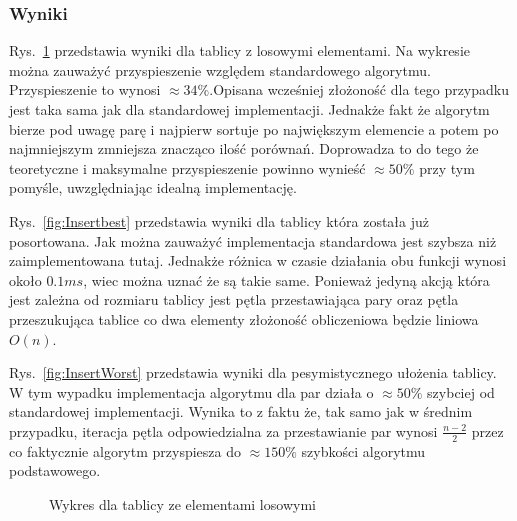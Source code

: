 \subsubsection*{Wyniki}
\par Rys.~\ref{fig:insertRand} przedstawia wyniki dla tablicy z losowymi elementami. Na wykresie można zauważyć przyspieszenie względem standardowego algorytmu. Przyspieszenie to wynosi $ \approx 34 \% $.Opisana wcześniej złożoność dla tego przypadku jest taka sama jak dla standardowej implementacji. Jednakże fakt że algorytm bierze pod uwagę parę i najpierw sortuje po największym elemencie a potem po najmniejszym zmniejsza znacząco ilość porównań. Doprowadza to do tego że teoretyczne i maksymalne przyspieszenie powinno wynieść $ \approx 50\% $ przy tym pomyśle, uwzględniając idealną implementację.
\par Rys.~\ref{fig:Insertbest} przedstawia wyniki dla tablicy która została już posortowana. Jak można zauważyć implementacja standardowa jest szybsza niż zaimplementowana tutaj. Jednakże różnica w czasie działania obu funkcji wynosi około $0.1ms$, wiec można uznać że są takie same. Ponieważ jedyną akcją która jest zależna od rozmiaru tablicy jest pętla przestawiająca pary oraz pętla przeszukująca tablice co dwa elementy złożoność obliczeniowa będzie liniowa $O(n)$.
\par Rys.~\ref{fig:InsertWorst} przedstawia wyniki dla pesymistycznego ułożenia tablicy. W tym wypadku implementacja algorytmu dla par działa o $\approx 50 \% $ szybciej od standardowej implementacji. Wynika to z faktu że, tak samo jak w średnim przypadku, iteracja pętla odpowiedzialna za przestawianie par wynosi $\frac{n-2}{2}$ przez co faktycznie algorytm przyspiesza do $\approx 150 \% $ szybkości algorytmu podstawowego.
\begin{figure}[!h]
  \begin{center}
    \caption{Wykres dla tablicy ze elementami losowymi}\label{fig:insertRand}
  \end{center}
\end{figure}\FloatBarrier
